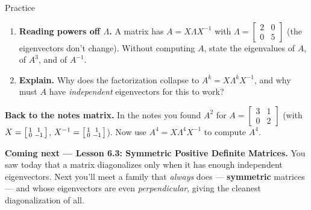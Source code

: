 \documentclass[10pt]{article}
\begin{document}
\begin{notesbox}{Practice}
\begin{enumerate}[leftmargin=1.9em, itemsep=12pt]
\begin{enumerate}[label=(\alph*), leftmargin=1.8em, itemsep=4pt]
    \end{enumerate}
    \vspace{1.2cm}
  \item \textbf{Reading powers off $\Lambda$.} A matrix has $A=X\Lambda X^{-1}$ with
        $\Lambda=\begin{bmatrix} 2 & 0 \\ 0 & 5 \end{bmatrix}$ (the eigenvectors don't change). Without
        computing $A$, state the eigenvalues of $A$, of $A^{3}$, and of $A^{-1}$. 
  \item \textbf{Explain.} Why does the factorization collapse to $A^k=X\Lambda^k X^{-1}$, and why must $A$
        have \emph{independent} eigenvectors for this to work? 
\end{enumerate}
\end{notesbox}

\begin{extensionbox}
\textbf{Back to the notes matrix.} In the notes you found $A^2$ for $A=\begin{bmatrix} 3 & 1 \\ 0 & 2 \end{bmatrix}$
(with $X=\begin{bsmallmatrix}1&1\\0&-1\end{bsmallmatrix}$, $X^{-1}=\begin{bsmallmatrix}1&1\\0&-1\end{bsmallmatrix}$).
Now use $A^4=X\Lambda^4 X^{-1}$ to compute $A^4$. 
\end{extensionbox}

\begin{spiralbox}
\textbf{Coming next --- Lesson 6.3: Symmetric Positive Definite Matrices.} You saw today that a matrix
diagonalizes only when it has enough independent eigenvectors. Next you'll meet a family that
\emph{always} does --- \textbf{symmetric} matrices --- and whose eigenvectors are even \emph{perpendicular},
giving the cleanest diagonalization of all.
\end{spiralbox}
\end{document}
